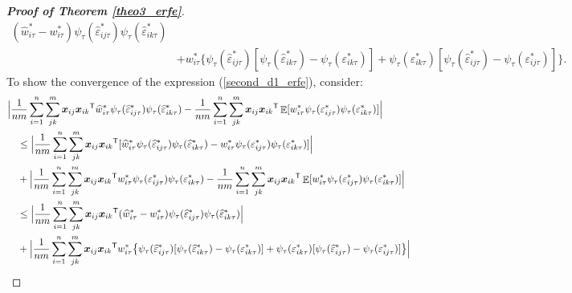 \documentclass[15pt,a4paper]{article}
\DeclareMathOperator{\E}{\mathbb{E}}
\newcommand{\transpose}{{}^{\text{\sffamily T}}}
\begin{document}
\begin{proof}[\textbf{Proof of Theorem \ref{theo3_erfe}}]
\begin{equation}
\begin{split}
(\widehat{w}^{*}_{i\tau}-w^{*}_{i\tau})\psi_{\tau}(\widehat{\varepsilon}^{*}_{ij\tau})\psi_{\tau}(\widehat{\varepsilon}^{*}_{ik\tau})  \\
& + w^{*}_{i\tau}\big\lbrace \psi_{\tau}(\widehat{\varepsilon}^{*}_{ij\tau})[\psi_{\tau}(\widehat{\varepsilon}^{*}_{ik\tau})-\psi_{\tau}(\varepsilon^{*}_{ik\tau})] + \psi_{\tau}(\varepsilon^{*}_{ik\tau})[\psi_{\tau}(\widehat{\varepsilon}^{*}_{ij\tau})-\psi_{\tau}(\varepsilon^{*}_{ij\tau})]\big\rbrace. 
\end{split}
\end{equation}
To show the convergence of the expression (\ref{second_d1_erfe}), consider:
\begin{align}\label{second_d1_term_conv_erfe}
\begin{split}
& \Big\lvert\frac{1}{nm}\sum_{i=1}^{n}\sum_{jk}^{m}\boldsymbol{x}_{ij}\boldsymbol{x}_{ik}\transpose\widehat{w}^{*}_{i\tau}\psi_{\tau}(\widehat{\varepsilon}^{*}_{ij\tau})\psi_{\tau}(\widehat{\varepsilon}^{*}_{ik\tau}) 
        - \frac{1}{nm}\sum_{i=1}^{n}\sum_{jk}^{m}\boldsymbol{x}_{ij}\boldsymbol{x}_{ik}\transpose\E[w^{*}_{i\tau}\psi_{\tau}(\varepsilon^{*}_{ij\tau})\psi_{\tau}(\varepsilon^{*}_{ik\tau})]\Big\rvert  \\
& \quad \leq \Big\lvert\frac{1}{nm}\sum_{i=1}^{n}\sum_{jk}^{m}\boldsymbol{x}_{ij}\boldsymbol{x}_{ik}\transpose
        [\widehat{w}^{*}_{i\tau}\psi_{\tau}(\widehat{\varepsilon}^{*}_{ij\tau})\psi_{\tau}(\widehat{\varepsilon}^{*}_{ik\tau})- w^{*}_{i\tau}\psi_{\tau}(\varepsilon^{*}_{ij\tau})\psi_{\tau}(\varepsilon^{*}_{ik\tau})]\Big\rvert \\
& \quad  + \Big\lvert\frac{1}{nm}\sum_{i=1}^{n}\sum_{jk}^{m}\boldsymbol{x}_{ij}\boldsymbol{x}_{ik}\transpose w^{*}_{i\tau}\psi_{\tau}(\varepsilon^{*}_{ij\tau})\psi_{\tau}(\varepsilon^{*}_{ik\tau})
        -\frac{1}{nm}\sum_{i=1}^{n}\sum_{jk}^{m}\boldsymbol{x}_{ij}\boldsymbol{x}_{ik}\transpose\E[w^{*}_{i\tau}\psi_{\tau}(\varepsilon^{*}_{ij\tau})\psi_{\tau}(\varepsilon^{*}_{ik\tau})]\Big\rvert  \\
& \quad \leq \Big\lvert\frac{1}{nm}\sum_{i=1}^{n}\sum_{jk}^{m}\boldsymbol{x}_{ij}\boldsymbol{x}_{ik}\transpose (\widehat{w}^{*}_{i\tau}-w^{*}_{i\tau})\psi_{\tau}(\widehat{\varepsilon}^{*}_{ij\tau})\psi_{\tau}(\widehat{\varepsilon}^{*}_{ik\tau})
        \Big\rvert \\
& \quad +    \Big\lvert\frac{1}{nm}\sum_{i=1}^{n}\sum_{jk}^{m}\boldsymbol{x}_{ij}\boldsymbol{x}_{ik}\transpose w^{*}_{i\tau} \big\lbrace \psi_{\tau}(\widehat{\varepsilon}^{*}_{ij\tau})  
        [\psi_{\tau}(\widehat{\varepsilon}^{*}_{ik\tau})-\psi_{\tau}(\varepsilon^{*}_{ik\tau})] + \psi_{\tau}(\varepsilon^{*}_{ik\tau}) [\psi_{\tau}(\widehat{\varepsilon}^{*}_{ij\tau})-\psi_{\tau}(\varepsilon^{*}_{ij\tau})]\big\rbrace\Big\rvert \\

\end{split}
\end{align}
\end{proof}
\end{document}
